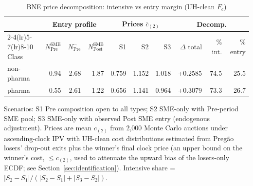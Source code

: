 \begin{table}[htbp]
\centering
\begin{threeparttable}
\caption{BNE price decomposition: intensive vs entry margin (UH-clean $F_c$)}
\label{tab:v3_bne_decomp}
\small
\begin{tabular}{lrrrrrrrrr}
\toprule
 & \multicolumn{3}{c}{Entry profile} & \multicolumn{3}{c}{Prices $\bar c_{(2)}$} & \multicolumn{3}{c}{Decomp.} \\
\cmidrule(lr){2-4}\cmidrule(lr){5-7}\cmidrule(lr){8-10}
Class & $N^{\text{SME}}_{\text{Pre}}$ & $N^{\neg}_{\text{Pre}}$ & $N^{\text{SME}}_{\text{Post}}$ & S1 & S2 & S3 & $\Delta$ total & \% int. & \% entry \\
\midrule
non-pharma & 0.94 & 2.68 & 1.87 & 0.759 & 1.152 & 1.018 & +0.2585 & 74.5 & 25.5 \\
pharma & 0.55 & 2.61 & 1.22 & 0.656 & 1.141 & 0.964 & +0.3079 & 73.3 & 26.7 \\
\bottomrule
\end{tabular}
\begin{tablenotes}\footnotesize
\item Scenarios: S1 Pre composition open to all types; S2 SME-only
with Pre-period SME pool; S3 SME-only with observed Post SME
entry (endogenous adjustment). Prices are mean $c_{(2)}$ from 2{,}000
Monte Carlo auctions under ascending-clock IPV with UH-clean cost
distributions estimated from Preg\~ao losers' drop-out exits plus
the winner's final clock price (an upper bound on the winner's
cost, $\le c_{(2)}$, used to attenuate the upward bias of the
losers-only ECDF; see Section~\ref{sec:identification}).
Intensive share = $|S_2 - S_1| / (|S_2-S_1| + |S_3-S_2|)$.
\end{tablenotes}
\end{threeparttable}
\end{table}
